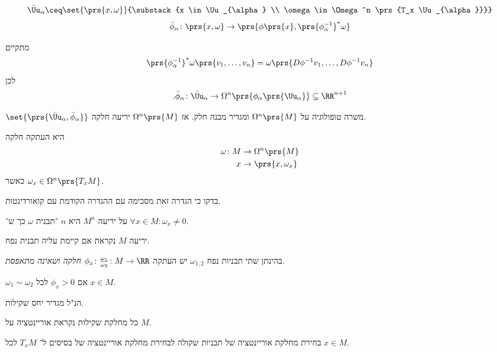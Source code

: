 \documentclass[a4paper,10pt,twoside,openany]{book}
\begin{document}
\begin{definition}
\begin{align*}
\bar{\Uu}_{\alpha} \ceq \set{\prs{x,\omega}}{\substack{x \in \Uu_{\alpha} \\ \omega \in \Omega^n \prs{T_x \Uu_{\alpha}}}}
\end{align*}
\begin{align*}
\bar{\phi}_{\alpha} \colon \prs{x,\omega} \to \prs{\phi\prs{x}, \prs{\phi^{-1}_{\alpha}}^* \omega}
\end{align*}
\end{definition}
\begin{remark}
מתקיים
\[\prs{\phi_{\alpha}^{-1}}^* \omega\prs{v_1, \ldots, v_n} = \omega\prs{D\phi^{-1}v_1, \ldots, D\phi^{-1}v_n}\]
לכן
\[\text{.}\bar{\phi}_{\alpha} \colon \bar{\Uu}_{\alpha} \to \Omega^n \prs{\phi_{\alpha}\prs{\Uu_{\alpha}}} \subseteq \RR^{n+1}\]
\end{remark}
\begin{exercise}
$\set{\prs{\bar{\Uu}_{\alpha}, \bar{\phi}_{\alpha}}}$
משרה טופולוגיה על
$\Omega^n\prs{M}$
ומגדיר מבנה חלק.
אז
$\Omega^n\prs{M}$
יריעה חלקה.
\end{exercise}
\begin{definition}
היא העתקה חלקה
\begin{align*}
\omega \colon M &\to \Omega^n \prs{M} \\
x &\to \prs{x,\omega_x}
\end{align*}
כאשר
$\omega_x \in \Omega^n \prs{T_x M}$.
\end{definition}
\begin{exercise}
בדקו כי הגדרה זאת מסכימה עם ההגדרה הקודמת עם קואורדינטות.
\end{exercise}
\begin{definition}
על יריעה
$M^n$
היא
$n$%
־תבנית
$\omega$
כך ש־%
$\forall x \in M \colon \omega_x \neq 0$.
\end{definition}

\begin{definition}
יריעה
$M$
נקראת
אם קיימת עליה תבנית נפח.
\end{definition}

\begin{exercise}
בהינתן שתי תבניות נפח
$\omega_{1,2}$
יש העתקה
$\phi_x \colon \frac{\omega_1}{\omega_2} \colon M \to \RR$
\emph{חלקה
ושאינה מתאפסת.}
\end{exercise}
\begin{definition}
$\omega_1 \sim \omega_2$
אם
$\phi_x > 0$
לכל
$x \in M$.
\end{definition}
\begin{exercise}
הנ"ל מגדיר יחס שקילות.
\end{exercise}
\begin{definition}
כל מחלקת שקילות נקראת אוריינטציה על
$M$.
\end{definition}
\begin{exercise}
בחירת מחלקת אוריינטציה של תבניות שקולה לבחירת מחלקת אוריינטציה של בסיסים ל־%
$T_x M$
לכל
$x \in M$.
\end{exercise}
\end{document}
